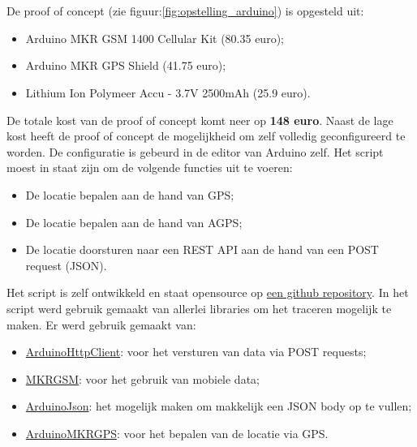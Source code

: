 \chapter{}
\label{ch:proof-of-concept}

\section{}
De proof of concept (zie figuur:\ref{fig:opstelling_arduino}) is opgesteld uit:
\begin{itemize}
	\item Arduino MKR GSM 1400 Cellular Kit (80.35 euro);
	\item Arduino MKR GPS Shield (41.75 euro);
	\item Lithium Ion Polymeer Accu - 3.7V 2500mAh (25.9 euro).
\end{itemize}
De totale kost van de proof of concept komt neer op \textbf{148 euro}. Naast de lage kost heeft de proof of concept de mogelijkheid om zelf volledig geconfigureerd te worden. De configuratie is gebeurd in de editor van Arduino zelf. Het script moest in staat zijn om de volgende functies uit te voeren:
\begin{itemize}
	\item De locatie bepalen aan de hand van GPS;
	\item De locatie bepalen aan de hand van AGPS;
	\item De locatie doorsturen naar een REST API aan de hand van een POST request (JSON).
\end{itemize}
Het script is zelf ontwikkeld en staat opensource op \href{https://github.com/IndyVC/bap-arduino}{een github repository}. In het script werd gebruik gemaakt van allerlei libraries om het traceren mogelijk te maken.
Er werd gebruik gemaakt van:
\begin{itemize}
	\item \href{https://github.com/arduino-libraries/ArduinoHttpClient}{ArduinoHttpClient}: voor het versturen van data via POST requests;
	\item \href{https://github.com/arduino-libraries/MKRGSM}{MKRGSM}: voor het gebruik van mobiele data;
	\item \href{https://github.com/bblanchon/ArduinoJson}{ArduinoJson}: het mogelijk maken om makkelijk een JSON body op te vullen;
	\item \href{https://github.com/arduino-libraries/Arduino_MKRGPS}{ArduinoMKRGPS}: voor het bepalen van de locatie via GPS.
\end{itemize}
